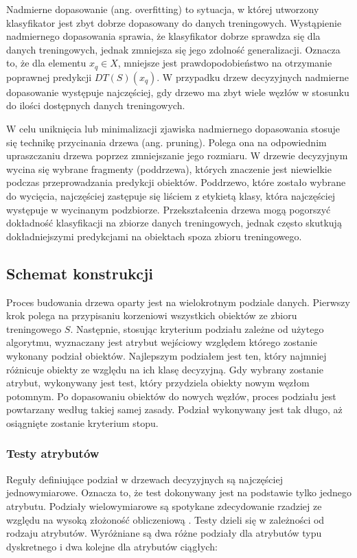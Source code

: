 \documentclass[12pt]{article}
\begin{document}
Nadmierne dopasowanie (ang. overfitting) to sytuacja, w której utworzony klasyfikator jest zbyt
dobrze dopasowany do danych treningowych. Wystąpienie nadmiernego dopasowania sprawia, że
klasyfikator dobrze sprawdza się dla danych treningowych, jednak zmniejsza się jego zdolność
generalizacji. Oznacza to, że dla elementu $x_q \in X$, mniejsze jest prawdopodobieństwo na otrzymanie
poprawnej predykcji $DT(S)(x_q)$. W przypadku drzew decyzyjnych nadmierne dopasowanie
występuje najczęściej, gdy drzewo ma zbyt wiele węzłów w stosunku do ilości dostępnych danych treningowych.

W celu uniknięcia lub minimalizacji zjawiska nadmiernego dopasowania stosuje się technikę przycinania drzewa (ang. pruning).
Polega ona na odpowiednim upraszczaniu drzewa poprzez zmniejszanie jego rozmiaru.
W drzewie decyzyjnym wycina się wybrane fragmenty (poddrzewa), których znaczenie jest niewielkie podczas przeprowadzania
predykcji obiektów. Poddrzewo, które zostało wybrane do wycięcia, najczęściej zastępuje się liściem z etykietą klasy, która
najczęściej występuje w wycinanym podzbiorze. Przekształcenia drzewa mogą pogorszyć dokładność klasyfikacji
na zbiorze danych treningowych, jednak często skutkują dokładniejszymi predykcjami na obiektach spoza zbioru treningowego.

\subsection{Schemat konstrukcji}
Proces budowania drzewa oparty jest na wielokrotnym podziale danych. Pierwszy krok polega na przypisaniu
korzeniowi wszystkich obiektów ze zbioru treningowego $S$. Następnie, stosując kryterium podziału zależne od
użytego algorytmu, wyznaczany jest atrybut wejściowy względem którego zostanie wykonany podział obiektów.
Najlepszym podziałem jest ten, który najmniej różnicuje obiekty ze względu na ich klasę decyzyjną.
Gdy wybrany zostanie atrybut, wykonywany jest test, który przydziela obiekty nowym węzłom potomnym.
Po dopasowaniu obiektów do nowych węzłów, proces podziału jest powtarzany według takiej samej zasady.
Podział wykonywany jest tak długo, aż osiągnięte zostanie kryterium stopu.

\subsubsection{Testy atrybutów}
Reguły definiujące podział w drzewach decyzyjnych są najczęściej jednowymiarowe.
Oznacza to, że test dokonywany jest na podstawie tylko jednego atrybutu.
Podziały wielowymiarowe są spotykane zdecydowanie rzadziej ze względu na wysoką złożoność obliczeniową \cite{eksploracja-danych}.
Testy dzieli się w zależności od rodzaju atrybutów. Wyróżniane są dwa różne podziały dla atrybutów typu dyskretnego i
dwa kolejne dla atrybutów ciągłych:
\newpage
\end{document}

